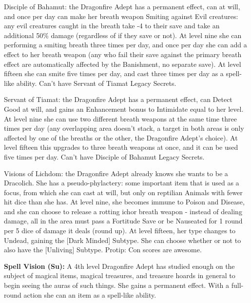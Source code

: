 \begin{description*}
\item[Disciple of Bahamut:] the Dragonfire Adept has a permanent  effect, can  at will, and once per day can make her breath weapon Smiting against Evil creatures: any evil creatures caught in the breath take -4 to their save and take an additional 50\% damage (regardless of if they save or not). At level nine she can performing a smiting breath three times per day, and once per day she can add a  effect to her breath weapon (any who fail their save against the primary breath effect are automatically affected by the Banishment, no separate save). At level fifteen she can smite five times per day, and cast  three times per day as a spell-like ability. Can't have Servant of Tiamat Legacy Secrets.
\item[Servant of Tiamat:] the Dragonfire Adept has a permanent  effect, can Detect Good at will, and gains an Enhancement bonus to Intimidate equal to her level. At level nine she can use two different breath weapons at the same time three times per day (any overlapping area doesn't stack, a target in both areas is only affected by one of the breaths or the other, the Dragonfire Adept's choice). At level fifteen this upgrades to three breath weapons at once, and it can be used five times per day. Can't have Disciple of Bahamut Legacy Secrets.
\item[Visions of Lichdom:] the Dragonfire Adept already knows she wants to be a Dracolich. She has a pseudo-phylactery: some important item that is used as a focus, from which she can cast  at will, but only on reptilian Animals with fewer hit dice than she has. At level nine, she becomes immune to Poison and Disease, and she can choose to release a rotting ichor breath weapon - instead of dealing damage, all in the area must pass a Fortitude Save or be Nauseated for 1 round per 5 dice of damage it deals (round up). At level fifteen, her type changes to Undead, gaining the [Dark Minded] Subtype. She can choose whether or not to also have the [Unliving] Subtype. Protip: Con scores are awesome.
\end{description*}

\textbf{Spell Vision (Su):} A 4th level Dragonfire Adept has studied enough on the subject of magical items, magical treasures, and treasure hoards in general to begin seeing the auras of such things. She gains a permanent  effect. With a full-round action she can  an item as a spell-like ability.

